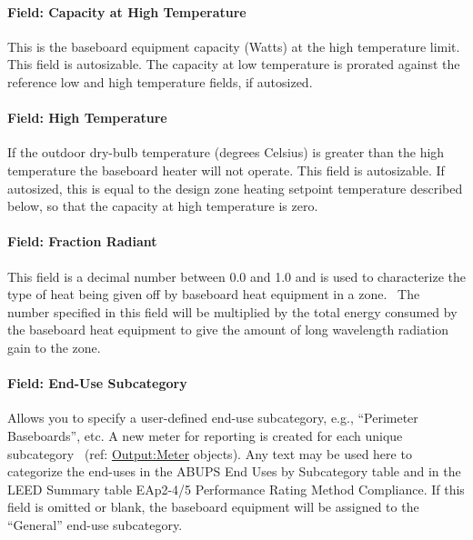 \paragraph{Field: Capacity at High Temperature}\label{field-capacity-at-high-temperature}

This is the baseboard equipment capacity (Watts) at the high temperature limit. This field is autosizable. The capacity at low temperature is prorated against the reference low and high temperature fields, if autosized.

\paragraph{Field: High Temperature}\label{field-high-temperature}

If the outdoor dry-bulb temperature (degrees Celsius) is greater than the high temperature the baseboard heater will not operate. This field is autosizable. If autosized, this is equal to the design zone heating setpoint temperature described below, so that the capacity at high temperature is zero.

\paragraph{Field: Fraction Radiant}\label{field-fraction-radiant-7}

This field is a decimal number between 0.0 and 1.0 and is used to characterize the type of heat being given off by baseboard heat equipment in a zone.~ The number specified in this field will be multiplied by the total energy consumed by the baseboard heat equipment to give the amount of long wavelength radiation gain to the zone.

\paragraph{Field: End-Use Subcategory}\label{field-end-use-subcategory-5}

Allows you to specify a user-defined end-use subcategory, e.g., ``Perimeter Baseboards'', etc. A new meter for reporting is created for each unique subcategory~ (ref: \hyperref[outputmeter-and-outputmetermeterfileonly]{Output:Meter} objects). Any text may be used here to categorize the end-uses in the ABUPS End Uses by Subcategory table and in the LEED Summary table EAp2-4/5 Performance Rating Method Compliance. If this field is omitted or blank, the baseboard equipment will be assigned to the ``General'' end-use subcategory.

